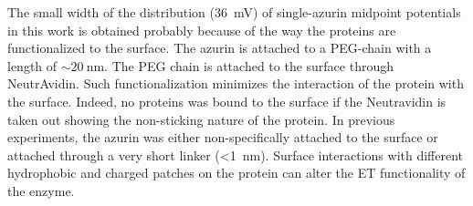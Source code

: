\documentclass[journal=jacsat,manuscript=article]{achemso}
\begin{document}
The small width of the distribution (\SI{36}{\mV}) of single-azurin midpoint potentials in this work is obtained probably because of the way the proteins are functionalized to the surface.
The azurin is attached to a PEG-chain with a length of ${\sim}\SI{20}{\nm}$.
The PEG chain is attached to the surface through NeutrAvidin.
Such functionalization minimizes the interaction of the protein with the surface.
Indeed, no proteins was bound to the surface if the Neutravidin is taken out showing the non-sticking nature of the protein.
In previous experiments, the azurin was either non-specifically attached to the surface or attached through a very short linker (\SI{<1}{\nm}).
Surface interactions with different hydrophobic and charged patches on the protein can alter the ET functionality of the enzyme.

\end{document}
